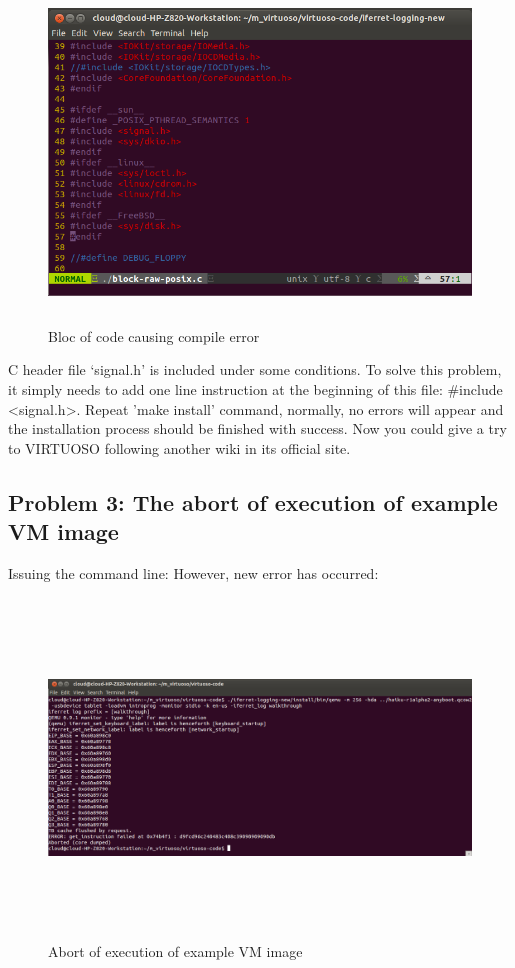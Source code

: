 \begin{figure}[htbp]
	\centering
		\includegraphics[width=14cm, height= 9cm ]{Figures/Figure34.png}
	\caption[Bloc of code causing compile error]{Bloc of code causing compile error}
	\label{fig:Bloc of code causing compile error}
\end{figure}

C header file ‘signal.h’ is included under some conditions. To solve this problem, it simply needs to  add one line instruction at the 
beginning of this file: \#include <signal.h>. Repeat 'make install' command, normally, no errors will appear and the installation process 
should be finished with success. Now you could give a try to VIRTUOSO following another wiki in its official site.

\subsection{Problem 3: The abort of execution of example VM image}
Issuing the command line:
However, new error has occurred:

\begin{figure}[htbp]
	\centering
		\includegraphics[width=14cm, height= 9cm ]{Figures/Figure35.png}
	\caption[Abort of execution of example VM image]{Abort of execution of example VM image}
	\label{fig:Abort of execution of example VM image}
\end{figure}

